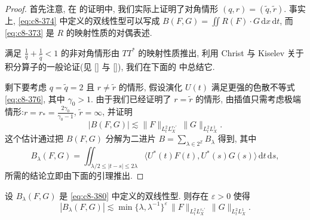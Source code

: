 \begin{proof}
首先注意, 在 的证明中, 我们实际上证明了对角情形 $(q, r)=(\widetilde{q}, \widetilde{r})$. 事实上, \eqref{eq:c8-374} 中定义的双线性型可以写成 $B(F, G)=\iint R(F)\cdot G\, \mathrm{d}x\, \mathrm{d}t$, 而 \eqref{eq:c8-373} 是 $R$ 的映射性质的对偶表述. 

满足 $\frac{1}{q}+\frac{1}{\widetilde{q}}<1$ 的非对角情形由 $TT^{*}$ 的映射性质推出, 利用 Christ 与 Kiselev 关于积分算子的一般论证(见 [] 与 []), 我们在下面的 中总结它. 

剩下要考虑 $q=\widetilde{q}=2$ 且 $r\neq\widetilde{r}$ 的情形, 假设演化 $U(t)$ 满足更强的色散不等式 \eqref{eq:c8-376}, 其中 $\gamma_0>1$. 由于我们已经证明了 $r=\widetilde{r}$ 的情形, 由插值只需考虑极端情形:$r=r_{*}=\frac{2\gamma_0}{\gamma_0-1}$, $\widetilde{r}=\infty$, 并证明
\[
|B(F, G)|\lesssim\|F\|_{L_t^2 L_X^{r_{*}'}}\, \|G\|_{L_t^2 L_X^1}.
\]
这个估计通过把 $B(F, G)$ 分解为二进片 $B=\sum_{\lambda\in2^{\mathbb{Z}}}B_{\lambda}$ 得到, 其中
\begin{equation}
B_{\lambda}(F, G)=\iint_{\lambda/2\leq|t-s|\leq2\lambda}\bigl\langle U^{*}(t)F(t), U^{*}(s)G(s)\bigr\rangle\, \mathrm{d}t\, \mathrm{d}s, \label{eq:c8-380}
\end{equation}
所需的结论立即由下面的引理推出. 
\end{proof}

\begin{lemma}\label{lem:c8-0.56}
设 $B_{\lambda}(F, G)$ 是 \eqref{eq:c8-380} 中定义的双线性型. 则存在 $\varepsilon>0$ 使得
\[
|B_{\lambda}(F, G)|\lesssim\min\bigl\{\lambda, \lambda^{-1}\bigr\}^{\varepsilon}\, \|F\|_{L_t^2 L_X^{r_{*}'}}\, \|G\|_{L_t^2 L_X^1}.
\]
\end{lemma}

